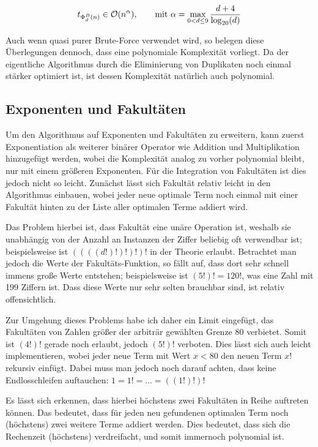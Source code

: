 \documentclass{article}
\theoremstyle{nonumberplain}
\begin{document}
\[t_{\Phi_{d}^{B}(n)} \in \mathcal{O}(n^{\alpha}),\qquad\text{mit }\alpha=\max_{0 < d \leq 9}\frac{d+4}{\log_{20}(d)}\]

Auch wenn quasi purer Brute-Force verwendet wird, so belegen diese Überlegungen dennoch, dass eine polynomiale Komplexität vorliegt.
Da der eigentliche Algorithmus durch die Eliminierung von Duplikaten noch einmal stärker optimiert ist, ist dessen Komplexität natürlich auch polynomial.

\subsection{Exponenten und Fakultäten}

Um den Algorithmus auf Exponenten und Fakultäten zu erweitern, kann zuerst Exponentiation als weiterer binärer Operator wie Addition und Multiplikation hinzugefügt werden, wobei die Komplexität analog zu vorher polynomial bleibt, nur mit einem größeren Exponenten.
Für die Integration von Fakultäten ist dies jedoch nicht so leicht.
Zunächst lässt sich Fakultät relativ leicht in den Algorithmus einbauen, wobei jeder neue optimale Term noch einmal mit einer Fakultät hinten zu der Liste aller optimalen Terme addiert wird.

Das Problem hierbei ist, dass Fakultät eine unäre Operation ist, weshalb sie unabhängig von der Anzahl an Instanzen der Ziffer beliebig oft verwendbar ist; beispielsweise ist \(((((d!)!)!)!)!\) in der Theorie erlaubt.
Betrachtet man jedoch die Werte der Fakultäts-Funktion, so fällt auf, dass dort sehr schnell immens große Werte entstehen; beispielsweise ist \((5!)!=120!\), was eine Zahl mit 199 Ziffern ist.
Dass diese Werte nur sehr selten brauchbar sind, ist relativ offensichtlich.

Zur Umgehung dieses Problems habe ich daher ein Limit eingefügt, das Fakultäten von Zahlen größer der arbiträr gewählten Grenze \(80\) verbietet.
Somit ist \((4!)!\) gerade noch erlaubt, jedoch \((5!)!\) verboten.
Dies lässt sich auch leicht implementieren, wobei jeder neue Term mit Wert \(x < 80\) den neuen Term \(x!\) rekursiv einfügt.
Dabei muss man jedoch noch darauf achten, dass keine Endlosschleifen auftauchen: \(1 = 1! = \ldots = ((1!)!)!\)

Es lässt sich erkennen, dass hierbei höchstens zwei Fakultäten in Reihe auftreten können.
Das bedeutet, dass für jeden neu gefundenen optimalen Term noch (höchstens) zwei weitere Terme addiert werden.
Dies bedeutet, dass sich die Rechenzeit (höchstens) verdreifacht, und somit immernoch polynomial ist.
\end{document}
